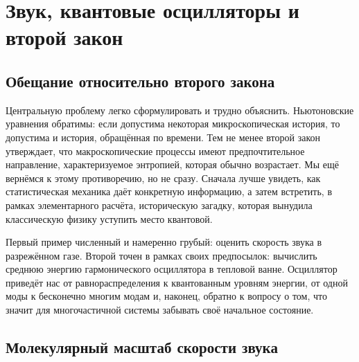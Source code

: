 \chapter{Звук, квантовые осцилляторы и второй закон}


\section{Обещание относительно второго закона}

Центральную проблему легко сформулировать и трудно объяснить. Ньютоновские уравнения обратимы: если допустима некоторая микроскопическая история, то допустима и история, обращённая по времени. Тем не менее второй закон утверждает, что макроскопические процессы имеют предпочтительное направление, характеризуемое энтропией, которая обычно возрастает. Мы ещё вернёмся к этому противоречию, но не сразу. Сначала лучше увидеть, как статистическая механика даёт конкретную информацию, а затем встретить, в рамках элементарного расчёта, историческую загадку, которая вынудила классическую физику уступить место квантовой.

Первый пример численный и намеренно грубый: оценить скорость звука в разрежённом газе. Второй точен в рамках своих предпосылок: вычислить среднюю энергию гармонического осциллятора в тепловой ванне. Осциллятор приведёт нас от равнораспределения к квантованным уровням энергии, от одной моды к бесконечно многим модам и, наконец, обратно к вопросу о том, что значит для многочастичной системы забывать своё начальное состояние.

\section{Молекулярный масштаб скорости звука}

